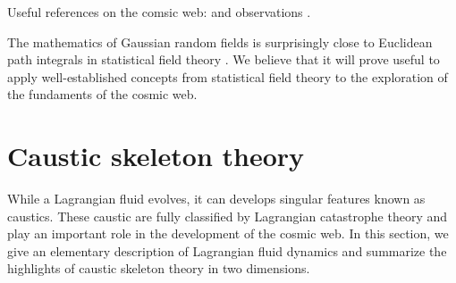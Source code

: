 \documentclass[a4paper, 11pt]{article}
\begin{document}
\begin{framed}
Useful references on the comsic web: 
\cite{Peebles:1980, Bond:1996, Weygaert:2008, Aragon:2010a, Aragon:2010b, Jasche:2010, Kitaura:2013, Cautun:2014, Leclercq:2015, Leclercq:2017, Libeskind:2017} and observations
\cite{Colless:2003, Tegmark:2004, Huchra:2012, Guzzo:2014}.
\end{framed}

\begin{framed}
The mathematics of Gaussian random fields is surprisingly close to Euclidean path integrals in statistical field theory \cite{Feynman:1965}. We believe that it will prove useful to apply well-established concepts from statistical field theory to the exploration of the fundaments of the cosmic web.
\end{framed}










\section{Caustic skeleton theory}
While a Lagrangian fluid evolves, it can develops singular features known as caustics. These caustic are fully classified by Lagrangian catastrophe theory and play an important role in the development of the cosmic web. In this section, we give an elementary description of Lagrangian fluid dynamics and summarize the highlights of caustic skeleton theory in two dimensions.


\end{document}
